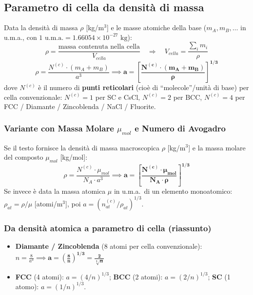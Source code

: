 \subsection{Parametro di cella da densità di massa}
Data la densità di massa $\rho$ [kg/m$^3$] e le masse atomiche della base ($m_A, m_B,\dots$ in u.m.a., con $1\text{ u.m.a.} = 1.66054 \times 10^{-27}\text{ kg}$):
\[ \rho = \frac{\text{massa contenuta nella cella}}{V_{cella}} \quad\Longrightarrow\quad V_{cella} = \frac{\sum_i m_i}{\rho} \]
\[ \rho = \frac{N^{(c)} \cdot (m_A + m_B)}{a^3} \implies \bm{a = \left[ \frac{N^{(c)} \cdot (m_A + m_B)}{\rho} \right]^{1/3}} \]
dove $N^{(c)}$ è il numero di \textbf{punti reticolari} (cioè di ``molecole''/unità di base) per cella convenzionale: $N^{(c)}=1$ per SC e CsCl, $N^{(c)}=2$ per BCC, $N^{(c)}=4$ per FCC / Diamante / Zincoblenda / NaCl / Fluorite.

\subsubsection*{Variante con Massa Molare $\mu_{mol}$ e Numero di Avogadro}
Se il testo fornisce la densità di massa macroscopica $\rho$ [kg/m$^3$] e la massa molare del composto $\mu_{mol}$ [kg/mol]:
\[ \rho = \frac{N^{(c)} \cdot \mu_{mol}}{N_A \cdot a^3} \implies \bm{a = \left[ \frac{N^{(c)} \cdot \mu_{mol}}{N_A \cdot \rho} \right]^{1/3}} \]
Se invece è data la massa atomica $\mu$ in u.m.a.\ di un elemento monoatomico:
$\rho_{at} = \rho/\mu$ [atomi/m$^3$], poi $a=(n_{at}^{(c)}/\rho_{at})^{1/3}$.


\subsubsection*{Da densità atomica a parametro di cella (riassunto)}
\begin{itemize}
  \item \textbf{Diamante / Zincoblenda} (8 atomi per cella convenzionale): $n = \frac{8}{a^3} \implies \bm{a = \left(\frac{8}{n}\right)^{1/3} = \frac{2}{\sqrt[3]{n}}}$
  \item \textbf{FCC} (4 atomi): $a = (4/n)^{1/3}$; \quad \textbf{BCC} (2 atomi): $a = (2/n)^{1/3}$; \quad \textbf{SC} (1 atomo): $a = (1/n)^{1/3}$.
\end{itemize}

